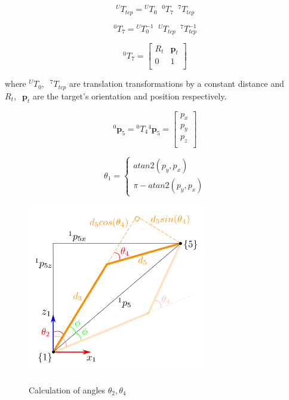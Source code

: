 \begin{equation}
{}^UT_{tcp} = {}^UT_0  \;\;  {}^0T_7  \;\;   {}^7T_{tcp}
\end{equation}

\begin{equation}
{}^0T_7 = {}^UT_0^{-1}  \;\;  {}^UT_{tcp}  \;\;  {}^7T_{tcp}^{-1}
\end{equation}

\begin{equation}
{}^0T_7 = \begin{bmatrix}
R_t & \mathbf{p}_t \\
0 & 1 \\
\end{bmatrix}
\end{equation}

where ${}^UT_0,  \;\;   {}^7T_{tcp}$ are translation transformations by a constant distance and $R_t,  \;\; \mathbf{p}_t$ are the target's orientation 
and position respectively.

\begin{equation}
{}^0\mathbf{p}_5 = {}^0T_4 {}^4\mathbf{p}_5 = \begin{bmatrix} p_x \\ p_y \\ p_z \\ \end{bmatrix}
\end{equation}

\begin{equation}
θ_1 = 
\begin{cases}
atan2 \left( p_y, p_x \right) \\
π - atan2 \left( p_y, p_x \right)
\end{cases}
\end{equation}

\begin{center}
\begin{figure}[H]
\centering
\includegraphics[width=8cm]{images/th2-4-calculation.png}\\
\caption{Calculation of angles $θ_2, θ_4$}
\end{figure}
\end{center}

